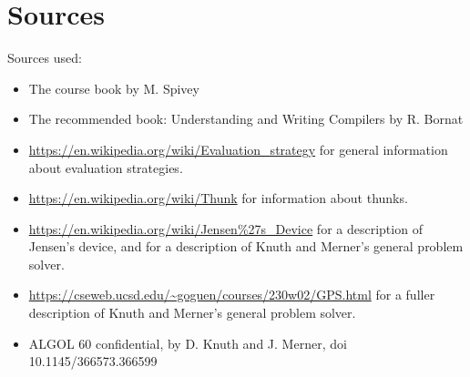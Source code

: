 \documentclass[a4paper,10pt]{article}
\begin{document}
\newpage
\section{Sources}
Sources used:
\begin{itemize}
    \item The course book by M. Spivey
    \item The recommended book: Understanding and Writing Compilers by R. Bornat
    \item \url{https://en.wikipedia.org/wiki/Evaluation\_strategy} for general information about evaluation strategies.
    \item \url{https://en.wikipedia.org/wiki/Thunk} for information about thunks.
    \item \url{https://en.wikipedia.org/wiki/Jensen\%27s\_Device} for a description of Jensen's device, and for a description of Knuth and Merner's general problem solver.
    \item \url{https://cseweb.ucsd.edu/~goguen/courses/230w02/GPS.html} for a fuller description of Knuth and Merner's general problem solver.
    \item ALGOL 60 confidential, by D. Knuth and J. Merner, doi 10.1145/366573.366599
\end{itemize}

\tableofcontents
\end{document}

